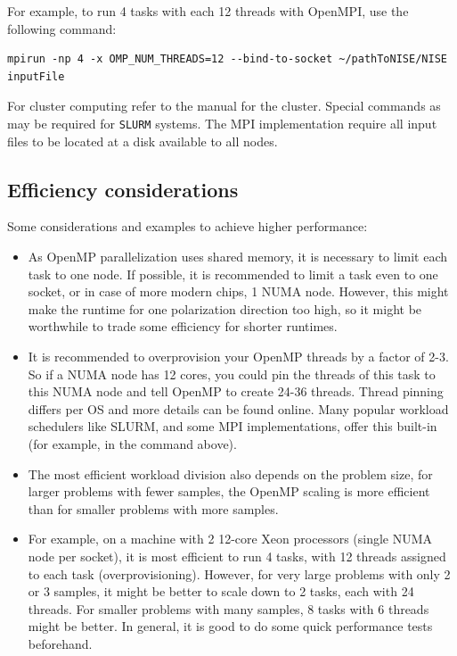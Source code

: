 For example, to run 4 tasks with each 12 threads with OpenMPI, use the following
command:
\begin{lstlisting}[style=BashInputStyle]
mpirun -np 4 -x OMP_NUM_THREADS=12 --bind-to-socket ~/pathToNISE/NISE inputFile
\end{lstlisting}

For cluster computing refer to the manual for the cluster. Special commands as
 may be required for {\tt SLURM} systems. The MPI implementation require all
input files to be located at a disk available to all nodes.

\subsection{Efficiency considerations}
Some considerations and examples to achieve higher performance:
\begin{itemize}
\item As OpenMP parallelization uses shared memory, it is necessary to limit each task to one node. If possible, it is recommended to limit a task even to one socket, or in case of more modern chips, 1 NUMA node. However, this might make the runtime for one polarization direction too high, so it might be worthwhile to trade some efficiency for shorter runtimes.
\item It is recommended to overprovision your OpenMP threads by a factor of 2-3. So if a NUMA node has 12 cores, you could pin the threads of this task to this NUMA node and tell OpenMP to create 24-36 threads. Thread pinning differs per OS and more details can be found online. Many popular workload schedulers like SLURM, and some MPI implementations, offer this built-in (for example,  in the command above).
\item The most efficient workload division also depends on the problem size, for larger problems with fewer samples, the OpenMP scaling is more efficient than for smaller problems with more samples.
\item For example, on a machine with 2 12-core Xeon processors (single NUMA node per socket), it is most efficient to run 4 tasks, with 12 threads assigned to each task (overprovisioning). However, for very large problems with only 2 or 3 samples, it might be better to scale down to 2 tasks, each with 24 threads. For smaller problems with many samples, 8 tasks with 6 threads might be better. In general, it is good to do some quick performance tests beforehand.
\end{itemize}

